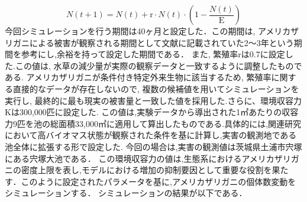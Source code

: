 \documentclass[12pt,a4j,titlepage]{ltjsarticle}
\begin{document}
\begin{equation}
  N(t+1) = N(t) + \mathrm{r} \cdot N(t) \cdot \left(1 - \frac{N(t)}{\mathrm{E}}\right)\label{eq:one}
\end{equation}
今回シミュレーションを行う期間は40ヶ月と設定した．この期間は, アメリカザリガニによる被害が観察される期間として文献に記載されていた2～3年という期間を参考にし,余裕を持って設定した期間である．
また, 繁殖率rは0.7に設定した.この値は, 水草の減少量が実際の観察データと一致するように調整したものである. アメリカザリガニが条件付き特定外来生物に該当するため, 繁殖率に関する直接的なデータが存在しないので, 複数の候補値を用いてシミュレーションを実行し, 最終的に最も現実の被害量と一致した値を採用した.さらに、環境収容力Kは300,000匹に設定した.
この値は,実験データから導出された1㎡あたりの収容力9匹を池の総面積33,000㎡に適用して算出したものである.具体的には,関連研究において高バイオマス状態が観察された条件を基に計算し,実害の観測地である池全体に拡張する形で設定した.
今回の場合は,実害の観測値は茨城県土浦市宍塚にある宍塚大池である．
この環境収容力の値は,生態系におけるアメリカザリガニの密度上限を表し,モデルにおける増加の抑制要因として重要な役割を果たす．このように設定されたパラメータを基に,アメリカザリガニの個体数変動をシミュレーションする．
シミュレーションの結果が以下である．
\end{document}
